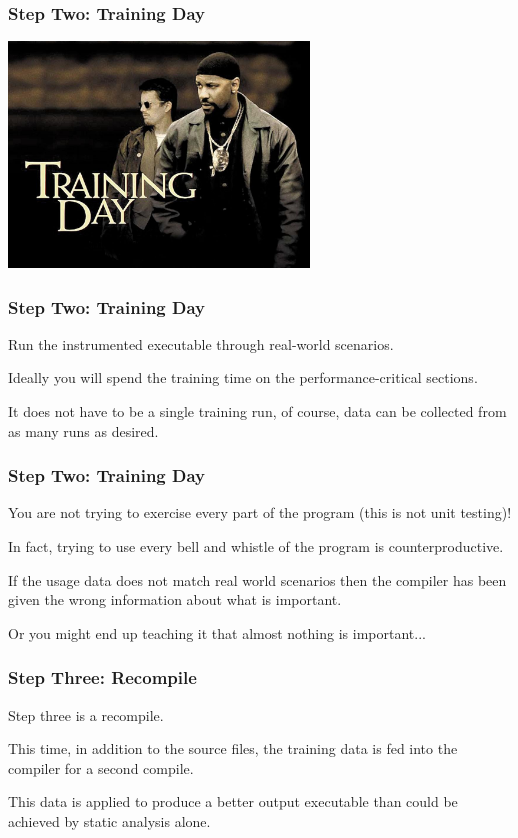 \begin{frame}
\frametitle{Step Two: Training Day}

\begin{center}
	\includegraphics[width=0.6\textwidth]{images/training-day.jpg}
\end{center}

\end{frame}


\begin{frame}
\frametitle{Step Two: Training Day}

Run the instrumented executable through real-world scenarios. 

Ideally you will spend the training time on the performance-critical sections. 

It does not have to be a single training run, of course, data can be collected from as many runs as desired. 

\end{frame}



\begin{frame}
\frametitle{Step Two: Training Day}

You are not trying to exercise every part of the program (this is not unit testing)!

In fact, trying to use every bell and whistle of the program is counterproductive.

If the usage data does not match real world scenarios then  the compiler has been given the wrong information about what is important. 

Or you might end up teaching it that almost nothing is important...

\end{frame}



\begin{frame}
\frametitle{Step Three: Recompile}

Step three is a recompile. 

This time, in addition to the source files, the training data is fed into the compiler for a second compile. 

This data is applied to produce a better output executable than could be achieved by static analysis alone.

\end{frame}



